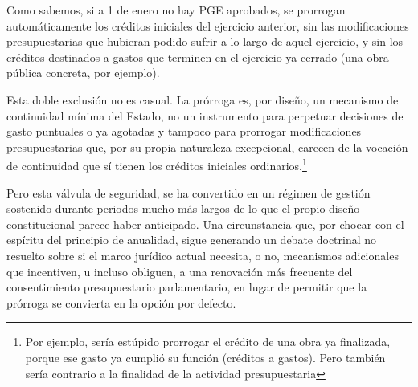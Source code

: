 \documentclass[10pt,a4paper]{article}
\begin{document}
Como sabemos, si a 1 de enero no hay PGE aprobados, se prorrogan automáticamente los créditos iniciales del ejercicio anterior, sin las modificaciones presupuestarias que hubieran podido sufrir a lo largo de aquel ejercicio, y sin los créditos destinados a gastos que terminen en el ejercicio ya cerrado (una obra pública concreta, por ejemplo). 

Esta doble exclusión no es casual. La prórroga es, por diseño, un mecanismo de continuidad mínima del Estado, no un instrumento para perpetuar decisiones de gasto puntuales o ya agotadas y tampoco para prorrogar modificaciones presupuestarias que, por su propia naturaleza excepcional, carecen de la vocación de continuidad que sí tienen los créditos iniciales ordinarios.\footnote{%
    Por ejemplo, sería estúpido prorrogar el crédito de una obra ya finalizada, porque ese gasto ya cumplió su función (créditos a gastos). Pero también sería contrario a la finalidad de la actividad presupuestaria
} 

Pero esta válvula de seguridad, se ha convertido en un régimen de gestión sostenido durante periodos mucho más largos de lo que el propio diseño constitucional parece haber anticipado. Una circunstancia que, por chocar con el espíritu del principio de anualidad, sigue generando un debate doctrinal no resuelto sobre si el marco jurídico actual necesita, o no, mecanismos adicionales que incentiven, u incluso obliguen, a una renovación más frecuente del consentimiento presupuestario parlamentario, en lugar de permitir que la prórroga se convierta en la opción por defecto.
\end{document}
